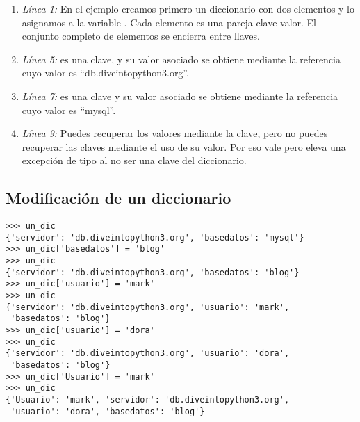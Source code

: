 \begin{enumerate}

\item \emph{Línea 1:} En el ejemplo creamos primero un diccionario con dos elementos y lo asignamos a la variable . Cada elemento es una pareja clave-valor. El conjunto completo de elementos se encierra entre llaves.

\item \emph{Línea 5:}  es una clave, y su valor asociado se obtiene mediante la referencia  cuyo valor es ``db.diveintopython3.org''.

\item \emph{Línea 7:}  es una clave y su valor asociado se obtiene mediante la referencia  cuyo valor es ``mysql''.

\item \emph{Línea 9:} Puedes recuperar los valores mediante la clave, pero no puedes recuperar las claves mediante el uso de su valor. Por eso  vale  pero  eleva una excepción de tipo  al no ser una clave del diccionario.

\end{enumerate}

\subsection{Modificación de un diccionario}

\noindent\begin{minipage}{\textwidth}
\begin{lstlisting}[mathescape=True]
>>> un_dic
{'servidor': 'db.diveintopython3.org', 'basedatos': 'mysql'}
>>> un_dic['basedatos'] = 'blog'
>>> un_dic
{'servidor': 'db.diveintopython3.org', 'basedatos': 'blog'}
>>> un_dic['usuario'] = 'mark'
>>> un_dic
{'servidor': 'db.diveintopython3.org', 'usuario': 'mark', 
 'basedatos': 'blog'}
>>> un_dic['usuario'] = 'dora'
>>> un_dic
{'servidor': 'db.diveintopython3.org', 'usuario': 'dora', 
 'basedatos': 'blog'}
>>> un_dic['Usuario'] = 'mark'
>>> un_dic
{'Usuario': 'mark', 'servidor': 'db.diveintopython3.org', 
 'usuario': 'dora', 'basedatos': 'blog'}
\end{lstlisting}
\end{minipage}

